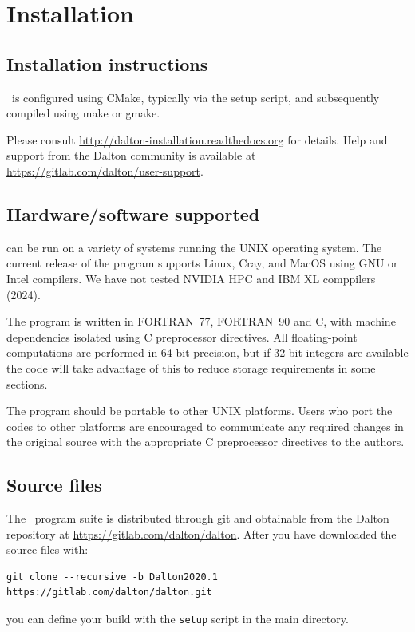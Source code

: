 \chapter{Installation}\label{ch:install}

\section{Installation instructions}

\dalton\ is configured using CMake, typically via the setup script,
and subsequently compiled using make or gmake.

Please consult \url{http://dalton-installation.readthedocs.org} for details.
Help and support from the Dalton community is available at \url{https://gitlab.com/dalton/user-support}.

\section{Hardware/software
supported}\label{sec:hardsoft}

{\dalton} can be run on a variety of systems running the UNIX operating system.
The current release of the program supports Linux, Cray,
and MacOS using GNU or Intel compilers.
We have not tested NVIDIA HPC and IBM XL comppilers (2024).

The program is written in FORTRAN~77,
FORTRAN~90 and C, with machine dependencies
isolated using C preprocessor directives.  All
floating-point computations are performed in 64-bit precision, but if 32-bit
integers are available the code will take advantage of this to reduce storage
requirements in some sections.

The program should be portable to other UNIX platforms.  Users
who port the codes to other platforms are encouraged to communicate any
required changes in the original source with the appropriate C preprocessor
directives to the authors.

\section{Source files}\label{sec:source}

The
\latestrelease\
program suite is distributed through git and obtainable from the Dalton
repository at \url{https://gitlab.com/dalton/dalton}.
After you have downloaded the source files with:
\begin{verbatim}
git clone --recursive -b Dalton2020.1 https://gitlab.com/dalton/dalton.git
\end{verbatim}
you can define your build with the \verb|setup| script in the main directory.


